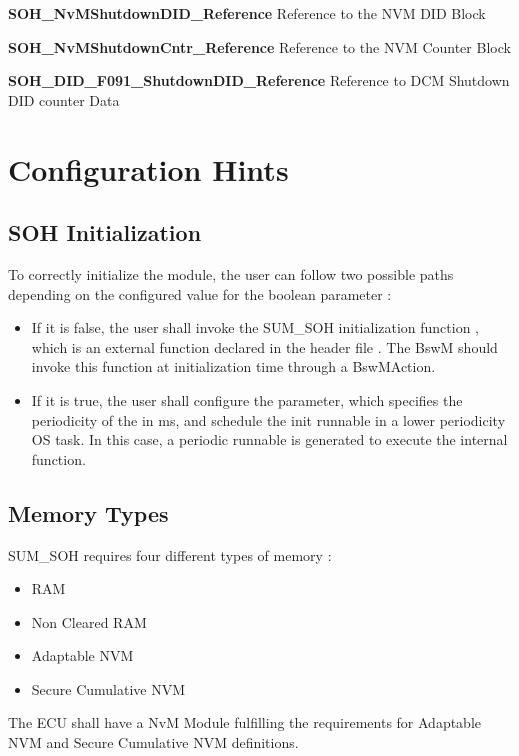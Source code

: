 \textbf{SOH\_NvMShutdownDID\_Reference}\newline
Reference to the NVM DID Block

\textbf{SOH\_NvMShutdownCntr\_Reference}\newline
Reference to the NVM Counter Block

\textbf{SOH\_DID\_F091\_ShutdownDID\_Reference}\newline
Reference to DCM Shutdown DID counter Data


\section{Configuration Hints}
\subsection{SOH Initialization}
\label{subsec:SohInit}
To correctly initialize the module, the user can follow two possible paths depending on the configured value for the boolean parameter  :
\begin{itemize}
\item If it is false, the user shall invoke the SUM\_SOH initialization function , which is an external function declared in the header file . The BswM should invoke this function at initialization time through a BswMAction.
\item If it is true, the user shall configure the  parameter, which specifies the periodicity of the  in ms, and schedule the init runnable in a lower periodicity OS task.
	  In this case, a periodic runnable is generated to execute the internal  function.
\end{itemize}

\subsection{Memory Types}
\label{subsec:memory}
SUM\_SOH requires four different types of memory : 

\begin{itemize}
	\item RAM
	\item Non Cleared RAM
    \item Adaptable NVM
    \item Secure Cumulative NVM
\end{itemize}


The ECU shall have a NvM Module fulfilling the requirements for Adaptable NVM and Secure Cumulative NVM definitions.

